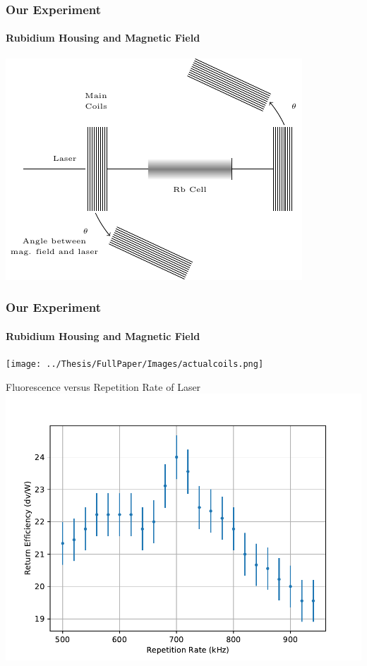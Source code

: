 \documentclass{beamer}
\begin{document}
\begin{frame}
  \frametitle{Our Experiment}
  \framesubtitle{Rubidium Housing and Magnetic Field}
  \centering
  \includegraphics[width = .8\textwidth]{../Thesis/FullPaper/Images/tikz/FlvsAngle}
\end{frame}

\begin{frame}
  \frametitle{Our Experiment}
  \framesubtitle{Rubidium Housing and Magnetic Field}
  \centering
  \texttt{[image: ../Thesis/FullPaper/Images/actualcoils.png]}
\end{frame}



\begin{frame}{Fluorescence versus Repetition Rate of Laser}
	\centering
	\includegraphics[width = .9\textwidth]{../MRPData/MAR24/FLvrep.pdf}
\end{frame}
\end{document}
